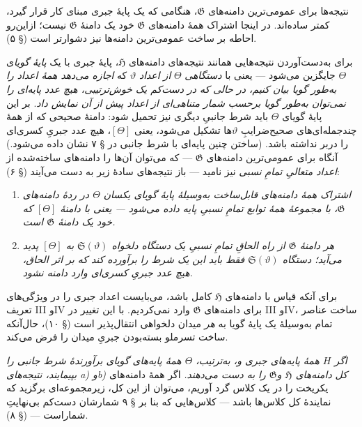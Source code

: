 \documentclass[11pt]{article}
\begin{document}
نتیجه‌ها برای عمومی‌ترین دامنه‌های $\mathfrak G$، هنگامی که یک پایهٔ جبری
مبنای کار قرار گیرد، کمتر ساده‌اند. در اینجا اشتراک همهٔ دامنه‌های
$\mathfrak G$ خود یک دامنهٔ $\mathfrak G$ نیست؛ ازاین‌رو احاطه بر ساخت
عمومی‌ترین دامنه‌ها نیز دشوارتر است (§ ۵).

برای به‌دست‌آوردن نتیجه‌هایی همانند نتیجه‌های دامنه‌های $\mathfrak H$، پایهٔ
جبری با یک \emph{پایهٔ گویا}ی $\Theta$ جایگزین می‌شود --- یعنی با
\emph{دستگاهی} $\Theta$ \emph{از اعداد} $\vartheta$ که \emph{اجازه می‌دهد
همهٔ اعداد را به‌طور گویا بیان کنیم، در حالی که در دست‌کم یک خوش‌ترتیبی، هیچ
عدد پایه‌ای را نمی‌توان به‌طور گویا برحسب شمار متناهی‌ای از اعداد پیش از آن
نمایش داد}. بر این پایهٔ گویای $\Theta$ باید شرط جانبیِ دیگری نیز تحمیل شود:
دامنهٔ صحیحی که از همهٔ چندجمله‌ای‌های صحیح‌ضرایبِ $\vartheta$ها تشکیل
می‌شود، یعنی $[\Theta]$، هیچ عدد جبریِ کسری‌ای را دربر نداشته باشد. (ساختن چنین پایه‌ای
با شرط جانبی در § ۷ نشان داده می‌شود.) آنگاه برای عمومی‌ترین دامنه‌های
$\mathfrak G$ --- که می‌توان آن‌ها را دامنه‌های ساخته‌شده از \emph{اعداد
متعالیِ تمامِ نسبی} نیز نامید --- باز نتیجه‌های سادهٔ زیر به دست می‌آیند (§ ۶):
\begin{enumerate}
\item[a)] \emph{اشتراک همهٔ دامنه‌های قابل‌ساخت به‌وسیلهٔ پایهٔ گویای یکسان
$\Theta$ در ردهٔ دامنه‌های $\mathfrak G$، با مجموعهٔ همهٔ توابع تمامِ نسبیِ
پایه داده می‌شود --- یعنی با دامنهٔ $[\Theta]$ که خود یک دامنهٔ
$\mathfrak G$ است.}
\item[b)] \emph{هر دامنهٔ $\mathfrak G$ از راه الحاقِ تمامِ نسبیِ یک
دستگاه دلخواه $\mathfrak S(\vartheta)$ به $[\Theta]$ پدید می‌آید؛ دستگاه
$\mathfrak S(\vartheta)$ فقط باید این یک شرط را برآورده کند که بر اثر الحاق،
هیچ عدد جبریِ کسری‌ای وارد دامنه نشود.}
\end{enumerate}

برای آنکه قیاس با دامنه‌های $\mathfrak H$ کامل باشد، می‌بایست اعداد جبری را
در ویژگی‌های تعریف III وIV برای دامنه‌های $\mathfrak G$ وارد نمی‌کردیم. با این
تغییر در III وIV، ساخت عناصر تمام به‌وسیلهٔ یک پایهٔ گویا به \emph{هر} میدان
دلخواهی انتقال‌پذیر است (§ ۱۰)، حال‌آنکه ساخت تسرملو بسته‌بودن جبریِ میدان را
فرض می‌کند.

\emph{اگر $H$ همهٔ پایه‌های جبری و، به‌ترتیب، $\Theta$ همهٔ پایه‌های گویای
برآورندهٔ شرط جانبی را بپیمایند، نتیجه‌های a) وb) کل دامنه‌های $\mathfrak H$
و$\mathfrak G$ را به دست می‌دهند.} اگر همهٔ دامنه‌های یکریخت را در یک کلاس
گرد آوریم، می‌توان از این کل، زیرمجموعه‌ای برگزید که نمایندهٔ کل کلاس‌ها باشد
--- کلاس‌هایی که بنا بر § ۹ شمارشان دست‌کم بی‌نهایتِ شماراست --- (§ ۸).
\end{document}
